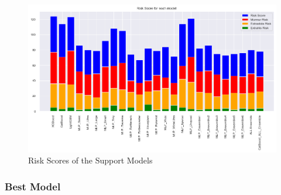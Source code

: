 \begin{figure}[h]
    \centering
    \includegraphics[width=\columnwidth]{../images/support_models_risk_scores.png}
    \caption{Risk Scores of the Support Models}
    \label{fig:support_models_risk_scores}
\end{figure}

\subsubsection*{Best Model}

